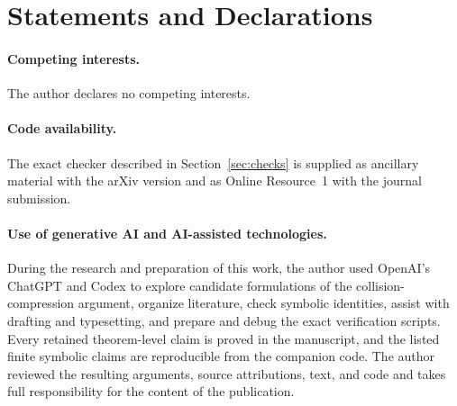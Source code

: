 \documentclass[11pt]{article}
\theoremstyle{remark}
\begin{document}
\section*{Statements and Declarations}

\paragraph{Competing interests.} The author declares no competing interests.

\paragraph{Code availability.} The exact checker described in Section~\ref{sec:checks} is supplied as ancillary material with the arXiv version and as Online Resource~1 with the journal submission.

\paragraph{Use of generative AI and AI-assisted technologies.} During the research and preparation of this work, the author used OpenAI's ChatGPT and Codex to explore candidate formulations of the collision-compression argument, organize literature, check symbolic identities, assist with drafting and typesetting, and prepare and debug the exact verification scripts. Every retained theorem-level claim is proved in the manuscript, and the listed finite symbolic claims are reproducible from the companion code. The author reviewed the resulting arguments, source attributions, text, and code and takes full responsibility for the content of the publication.
\end{document}

